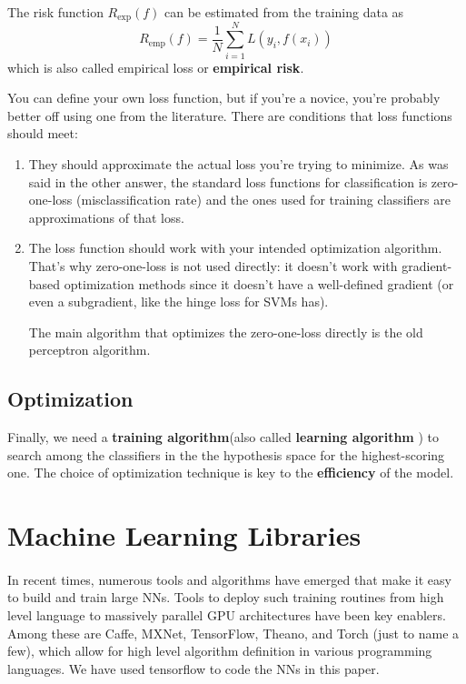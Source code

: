 \begin{definition}
The risk function $R_{\mathrm{exp}}(f)$ can be estimated from the training data as
\begin{equation}
R_{\mathrm{emp}}(f)=\dfrac{1}{N}\sum\limits_{i=1}^{N} L\left(y_i,f(x_i)\right)
\end{equation}
which is also called empirical loss or \textbf{empirical risk}.
\end{definition}

You can define your own loss function, but if you're a novice, you're probably better off using one from the literature. There are conditions that loss functions should meet:
\begin{enumerate}
\item They should approximate the actual loss you're trying to minimize. As was said in the other answer, the standard loss functions for classification is zero-one-loss (misclassification rate) and the ones used for training classifiers are approximations of that loss.
\item The loss function should work with your intended optimization algorithm. That's why zero-one-loss is not used directly: it doesn't work with gradient-based optimization methods since it doesn't have a well-defined gradient (or even a subgradient, like the hinge loss for SVMs has).

The main algorithm that optimizes the zero-one-loss directly is the old perceptron algorithm.
\end{enumerate}

\subsection{Optimization}
Finally, we need a \textbf{training algorithm}(also called \textbf{learning algorithm} ) to search among the classifiers in the the hypothesis space for the highest-scoring one. The choice of optimization technique is key to the \textbf{efficiency} of the model.

\section{Machine Learning Libraries}
\paragraph{}In recent times, numerous tools and algorithms have emerged that make it easy to build and train large NNs. Tools to deploy such training routines from high level language to massively parallel GPU architectures have been key enablers. Among these are Caffe, MXNet, TensorFlow, Theano, and Torch (just to name a few), which allow for high level algorithm definition in various programming languages. We have used tensorflow to code the NNs in this paper. 



